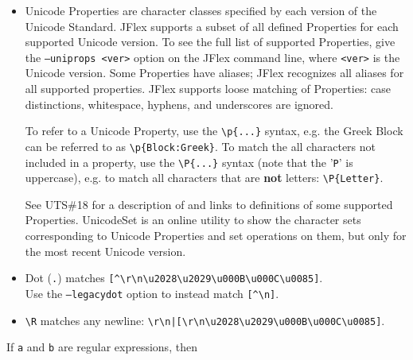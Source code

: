\documentclass[11pt]{scrartcl}
\begin{document}
\begin{itemize}
\begin{itemize}
  \label{unipropsyntax}
  \item
    Unicode Properties are character classes specified by each version of the
    Unicode Standard. JFlex supports a subset of all defined Properties for
    each supported Unicode version. To see the full list of supported
    Properties, give the \texttt{--uniprops <ver>} option on the JFlex
    command line, where \texttt{<ver>} is the Unicode version. Some
    Properties have aliases; JFlex recognizes all aliases for all supported
    properties. JFlex supports loose matching of Properties: case
    distinctions, whitespace, hyphens, and underscores are ignored.

    To refer to a Unicode Property, use the \verb+\p{...}+ syntax, e.g. the
    Greek Block can be referred to as \verb+\p{Block:Greek}+. To match the
    all characters not included in a property, use the \verb+\P{...}+ syntax
    (note that the '\verb+P+' is uppercase), e.g. to match all characters
    that are \textbf{not} letters: \verb+\P{Letter}+.
     
    See UTS\#18 \cite{unicode_rep} for a description of and links to
    definitions of some supported Properties. UnicodeSet \cite{UnicodeSet}
    is an online utility to show the character sets corresponding to
    Unicode Properties and set operations on them, but only for the most
    recent Unicode version.

  \item
    Dot (\texttt{.}) matches \verb+[^\r\n\u2028\u2029\u000B\u000C\u0085]+.\\
    Use the \texttt{--legacydot} option to instead match \verb+[^\n]+.
    
  \item
    \verb+\R+ matches any newline: \verb+\r\n|[\r\n\u2028\u2029\u000B\u000C\u0085]+.
  
  \end{itemize}

\end{itemize}

    If \texttt{a} and \texttt{b} are regular expressions, then
\end{document}
